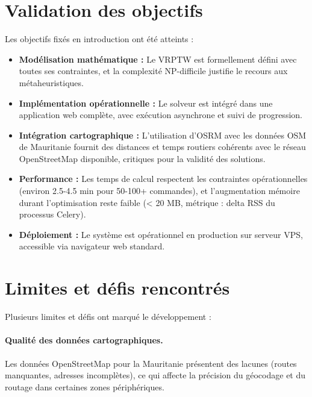 \documentclass[12pt,a4paper]{report}
\begin{document}
\section*{Validation des objectifs}

Les objectifs fixés en introduction ont été atteints :

\begin{itemize}[leftmargin=2.2em]
    \item \textbf{Modélisation mathématique :} Le VRPTW est formellement défini avec toutes ses contraintes, et la complexité NP-difficile justifie le recours aux métaheuristiques.

    \item \textbf{Implémentation opérationnelle :} Le solveur est intégré dans une application web complète, avec exécution asynchrone et suivi de progression.

    \item \textbf{Intégration cartographique :} L'utilisation d'OSRM avec les données OSM de Mauritanie fournit des distances et temps routiers cohérents avec le réseau OpenStreetMap disponible, critiques pour la validité des solutions.

    \item \textbf{Performance :} Les temps de calcul respectent les contraintes opérationnelles (environ 2.5-4.5 min pour 50-100+ commandes), et l'augmentation mémoire durant l'optimisation reste faible (< 20 MB, métrique : delta RSS du processus Celery).

    \item \textbf{Déploiement :} Le système est opérationnel en production sur serveur VPS, accessible via navigateur web standard.
\end{itemize}

\section*{Limites et défis rencontrés}

Plusieurs limites et défis ont marqué le développement :

\paragraph{Qualité des données cartographiques.} Les données OpenStreetMap pour la Mauritanie présentent des lacunes (routes manquantes, adresses incomplètes), ce qui affecte la précision du géocodage et du routage dans certaines zones périphériques.
\end{document}
